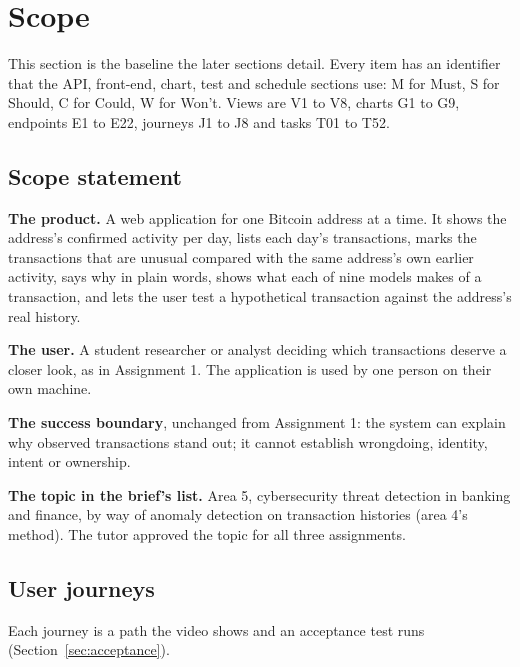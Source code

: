 \section{Scope}
\label{sec:scope}

This section is the baseline the later sections detail. Every item has an identifier that the API,
front-end, chart, test and schedule sections use: M for Must, S for Should, C for Could, W for
Won't. Views are V1 to V8, charts G1 to G9, endpoints E1 to E22, journeys J1 to J8 and tasks T01
to T52.

\subsection{Scope statement}

\textbf{The product.} A web application for one Bitcoin address at a time. It shows the address's
confirmed activity per day, lists each day's transactions, marks the transactions that are unusual
compared with the same address's own earlier activity, says why in plain words, shows what each of
nine models makes of a transaction, and lets the user test a hypothetical transaction against the
address's real history.

\textbf{The user.} A student researcher or analyst deciding which transactions deserve a closer
look, as in Assignment 1. The application is used by one person on their own machine.

\textbf{The success boundary}, unchanged from Assignment 1: the system can explain why observed
transactions stand out; it cannot establish wrongdoing, identity, intent or ownership.

\textbf{The topic in the brief's list.} Area 5, cybersecurity threat detection in banking and
finance, by way of anomaly detection on transaction histories (area 4's method). The tutor approved
the topic for all three assignments.

\subsection{User journeys}
\label{sec:journeys}

Each journey is a path the video shows and an acceptance test runs (Section~\ref{sec:acceptance}).

